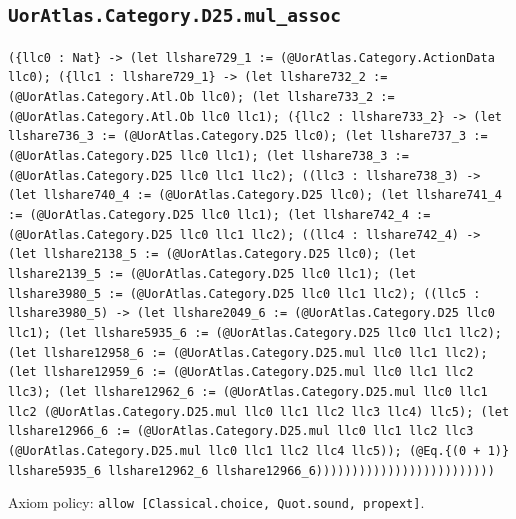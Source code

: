 \documentclass[11pt]{article}
\begin{document}
\subsection*{\texttt{UorAtlas.Category.D25.mul\_assoc}}
\noindent\texttt{(\{llc0 : Nat\} -> (let llshare729\_1 := (@UorAtlas.Category.ActionData llc0); (\{llc1 : llshare729\_1\} -> (let llshare732\_2 := (@UorAtlas.Category.Atl.Ob llc0); (let llshare733\_2 := (@UorAtlas.Category.Atl.Ob llc0 llc1); (\{llc2 : llshare733\_2\} -> (let llshare736\_3 := (@UorAtlas.Category.D25 llc0); (let llshare737\_3 := (@UorAtlas.Category.D25 llc0 llc1); (let llshare738\_3 := (@UorAtlas.Category.D25 llc0 llc1 llc2); ((llc3 : llshare738\_3) -> (let llshare740\_4 := (@UorAtlas.Category.D25 llc0); (let llshare741\_4 := (@UorAtlas.Category.D25 llc0 llc1); (let llshare742\_4 := (@UorAtlas.Category.D25 llc0 llc1 llc2); ((llc4 : llshare742\_4) -> (let llshare2138\_5 := (@UorAtlas.Category.D25 llc0); (let llshare2139\_5 := (@UorAtlas.Category.D25 llc0 llc1); (let llshare3980\_5 := (@UorAtlas.Category.D25 llc0 llc1 llc2); ((llc5 : llshare3980\_5) -> (let llshare2049\_6 := (@UorAtlas.Category.D25 llc0 llc1); (let llshare5935\_6 := (@UorAtlas.Category.D25 llc0 llc1 llc2); (let llshare12958\_6 := (@UorAtlas.Category.D25.mul llc0 llc1 llc2); (let llshare12959\_6 := (@UorAtlas.Category.D25.mul llc0 llc1 llc2 llc3); (let llshare12962\_6 := (@UorAtlas.Category.D25.mul llc0 llc1 llc2 (@UorAtlas.Category.D25.mul llc0 llc1 llc2 llc3 llc4) llc5); (let llshare12966\_6 := (@UorAtlas.Category.D25.mul llc0 llc1 llc2 llc3 (@UorAtlas.Category.D25.mul llc0 llc1 llc2 llc4 llc5)); (@Eq.\{(0 + 1)\} llshare5935\_6 llshare12962\_6 llshare12966\_6)))))))))))))))))))))))))}\par
\noindent Axiom policy: \texttt{allow [Classical.choice, Quot.sound, propext]}.\par
\end{document}
